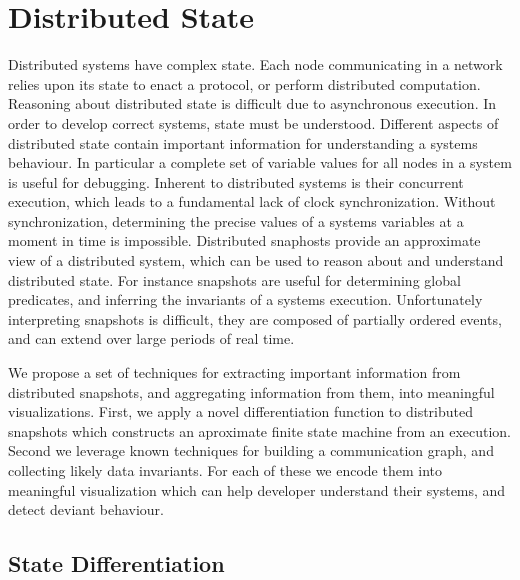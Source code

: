 \section{Distributed State}
\label{sec:distributed-state}


Distributed systems have complex state. Each node communicating in a network
relies upon its state to enact a protocol, or perform distributed computation.
Reasoning about distributed state is difficult due to asynchronous execution. In
order to develop correct systems, state must be understood. Different aspects of
distributed state contain important information for understanding a systems
behaviour. In particular a complete set of variable values for all nodes in a
system is useful for debugging. Inherent to distributed systems is their
concurrent execution, which leads to a fundamental lack of clock
synchronization. Without synchronization, determining the precise values of a
systems variables at a moment in time is impossible. Distributed snaphosts
provide an approximate view of a distributed system, which can be used to reason
about and understand distributed state. For instance snapshots are useful for
determining global predicates, and inferring the invariants of a systems
execution. Unfortunately interpreting snapshots is difficult, they are composed
of partially ordered events, and can extend over large periods of real time.

We propose a set of techniques for extracting important information
from distributed snapshots, and aggregating information from them,
into meaningful visualizations. First, we apply a novel
differentiation function to distributed snapshots which constructs an
aproximate finite state machine from an execution.  Second we leverage
known techniques for building a communication graph, and collecting
likely data invariants. For each of these we encode them into
meaningful visualization which can help developer understand their
systems, and detect deviant behaviour.

\subsection{State Differentiation}

